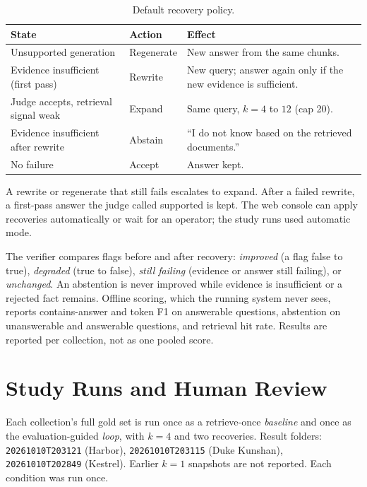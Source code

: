 \documentclass[12pt, a4paper, oneside]{report}
\begin{document}
\begin{table}[htbp]
\centering
\small
\begin{tabular}{@{}p{4.4cm}p{2.2cm}p{7.2cm}@{}}
\toprule
State & Action & Effect \\
\midrule
Unsupported generation & Regenerate & New answer from the same chunks. \\
Evidence insufficient (first pass) & Rewrite & New query; answer again only
if the new evidence is sufficient. \\
Judge accepts, retrieval signal weak & Expand & Same query, $k=4$ to $12$
(cap 20). \\
Evidence insufficient after rewrite & Abstain & ``I do not know based on
the retrieved documents.'' \\
No failure & Accept & Answer kept. \\
\bottomrule
\end{tabular}
\caption{Default recovery policy.}
\label{tbl:actions}
\end{table}

A rewrite or regenerate that still fails escalates to expand. After a
failed rewrite, a first-pass answer the judge called supported is kept.
The web console can apply recoveries automatically or wait for an
operator; the study runs used automatic mode.

The verifier compares flags before and after recovery:
\emph{improved} (a flag false to true), \emph{degraded} (true to false),
\emph{still failing} (evidence or answer still failing), or
\emph{unchanged}. An abstention is never improved while evidence is
insufficient or a rejected fact remains. Offline scoring, which the
running system never sees, reports contains-answer and token F1 on
answerable questions, abstention on unanswerable and answerable questions,
and retrieval hit rate. Results are reported per collection, not as one
pooled score.

\section{Study Runs and Human Review}

Each collection's full gold set is run once as a retrieve-once
\emph{baseline} and once as the evaluation-guided \emph{loop}, with
$k=4$ and two recoveries. Result folders:
\texttt{20261010T203121} (Harbor), \texttt{20261010T203115} (Duke
Kunshan), \texttt{20261010T202849} (Kestrel). Earlier $k=1$ snapshots are
not reported. Each condition was run once.
\end{document}
